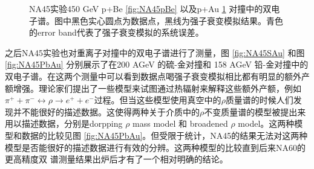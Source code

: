\begin{figure}[htb]
\begin{subfigure}[b]{0.47\textwidth}
        \caption{}
        \label{fig:NA45pAu}
    \end{subfigure}
    \caption[NA45实验p+Be及p+Au对撞中低质量区间双电子谱]{NA45实验450 GeV p+Be \ref{fig:NA45pBe} 以及p+Au \ref{fig:NA45pAu} 对撞中的双电子谱。图中黑色实心圆点为数据点，黑线为强子衰变模拟结果。青色的error band代表了强子衰变模拟的系统误差。}
       \label{fig:NA45pA}
\end{figure}

之后NA45实验也对重离子对撞中的双电子谱进行了测量，图 \ref{fig:NA45SAu} 和图 \ref{fig:NA45PbAu} 分别展示了在200 AGeV 的硫-金对撞和 158 AGeV 铅-金对撞中的双电子谱。在这两个测量中可以看到数据点喝强子衰变模拟相比都有明显的额外产额增强。理论家们提出了一些模型来试图通过热辐射来解释这些额外产额，例如$\pi^+ + \pi^- \leftrightarrow \rho \rightarrow e^+ + e^-$过程。但当这些模型使用真空中的$\rho$质量谱的时候人们发现并不能很好的描述数据。这使得两种关于介质中的$\rho$不变质量谱的模型被提出来用以描述数据，分别是dorpping $\rho$ mass model 和 broadened $\rho$ model。这两种模型和数据的比较见图 \ref{fig:NA45PbAu}。但受限于统计，NA45的结果无法对这两种模型是否能很好的描述数据进行有效的分辨。这两种模型的比较直到后来NA60的更高精度双 \muon 谱测量结果出炉后才有了一个相对明确的结论。

